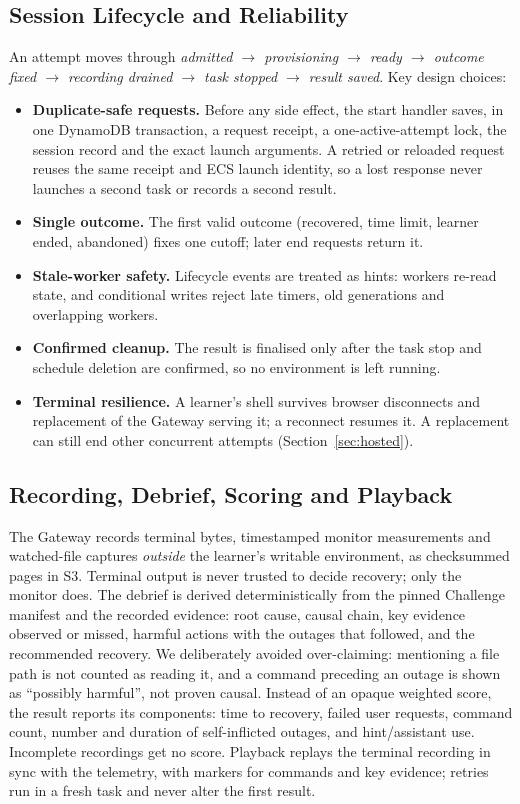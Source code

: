 \documentclass[11pt,a4paper]{article}
\begin{document}
\subsection{Session Lifecycle and Reliability}
An attempt moves through
\emph{admitted $\rightarrow$ provisioning $\rightarrow$ ready $\rightarrow$
outcome fixed $\rightarrow$ recording drained $\rightarrow$ task stopped
$\rightarrow$ result saved}. Key design choices:
\begin{itemize}
  \item \textbf{Duplicate-safe requests.} Before any side effect, the start
  handler saves, in one DynamoDB transaction, a request receipt, a one-active-attempt
  lock, the session record and the exact launch arguments. A retried or
  reloaded request reuses the same receipt and ECS launch identity, so a lost
  response never launches a second task or records a second result.
  \item \textbf{Single outcome.} The first valid outcome (recovered, time limit,
  learner ended, abandoned) fixes one cutoff; later end requests return it.
  \item \textbf{Stale-worker safety.} Lifecycle events are treated as hints:
  workers re-read state, and conditional writes reject late timers, old
  generations and overlapping workers.
  \item \textbf{Confirmed cleanup.} The result is finalised only after the task
  stop and schedule deletion are confirmed, so no environment is left running.
  \item \textbf{Terminal resilience.} A learner's shell survives browser
  disconnects and replacement of the Gateway serving it; a reconnect resumes it.
  A replacement can still end other concurrent attempts
  (Section~\ref{sec:hosted}).
\end{itemize}

\subsection{Recording, Debrief, Scoring and Playback}
The Gateway records terminal bytes, timestamped monitor measurements and
watched-file captures \emph{outside} the learner's writable environment, as
checksummed pages in S3. Terminal output is never trusted to decide recovery;
only the monitor does. The debrief is derived deterministically from the
pinned Challenge manifest and the recorded evidence: root cause, causal chain,
key evidence observed or missed, harmful actions with the outages that
followed, and the recommended recovery. We deliberately avoided over-claiming:
mentioning a file path is not counted as reading it, and a command preceding
an outage is shown as ``possibly harmful'', not proven causal. Instead of an
opaque weighted score, the result reports its components: time to recovery,
failed user requests, command count, number and duration of self-inflicted
outages, and hint/assistant use. Incomplete recordings get no score. Playback
replays the terminal recording in sync with the telemetry, with markers for
commands and key evidence; retries run in a fresh task and never alter the
first result.
\end{document}
